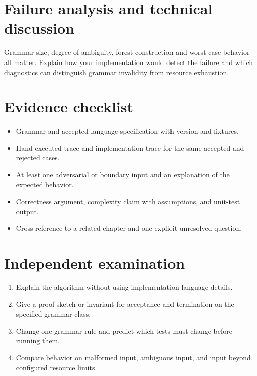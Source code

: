 \documentclass[11pt,letterpaper]{article}
\begin{document}
\section{Failure analysis and technical discussion}
Grammar size, degree of ambiguity, forest construction and worst-case behavior all matter. Explain how your implementation would detect the failure and which diagnostics can distinguish grammar invalidity from resource exhaustion.
\section{Evidence checklist}
\begin{itemize}
\item Grammar and accepted-language specification with version and fixtures.
\item Hand-executed trace and implementation trace for the same accepted and rejected cases.
\item At least one adversarial or boundary input and an explanation of the expected behavior.
\item Correctness argument, complexity claim with assumptions, and unit-test output.
\item Cross-reference to a related chapter and one explicit unresolved question.
\end{itemize}
\section{Independent examination}
\begin{enumerate}
\item Explain the algorithm without using implementation-language details.
\item Give a proof sketch or invariant for acceptance and termination on the specified grammar class.
\item Change one grammar rule and predict which tests must change before running them.
\item Compare behavior on malformed input, ambiguous input, and input beyond configured resource limits.
\end{enumerate}
\end{document}
